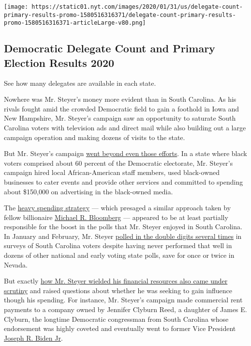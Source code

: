 \href{https://www.nytimes.com/interactive/2020/us/elections/delegate-count-primary-results.html}{}

\texttt{[image: https://static01.nyt.com/images/2020/01/31/us/delegate-count-primary-results-promo-1580516316371/delegate-count-primary-results-promo-1580516316371-articleLarge-v80.png]}

\hypertarget{democratic-delegate-count-and-primary-election-results-2020}{%
\subsection{Democratic Delegate Count and Primary Election Results
2020}\label{democratic-delegate-count-and-primary-election-results-2020}}

See how many delegates are available in each state.

Nowhere was Mr. Steyer's money more evident than in South Carolina. As
his rivals fought amid the crowded Democratic field to gain a foothold
in Iowa and New Hampshire, Mr. Steyer's campaign saw an opportunity to
saturate South Carolina voters with television ads and direct mail while
also building out a large campaign operation and making dozens of visits
to the state.

But Mr. Steyer's campaign
\href{https://www.nytimes.com/2020/01/25/us/politics/tom-steyer-millions-south-carolina.html}{went
beyond even those efforts}. In a state where black voters comprised
about 60 percent of the Democratic electorate, Mr. Steyer's campaign
hired local African-American staff members, used black-owned businesses
to cater events and provide other services and committed to spending
about \$150,000 on advertising in the black-owned media.

The
\href{https://www.nytimes.com/2019/07/19/us/politics/tom-steyer-2020-campaign.html}{heavy
spending strategy} --- which presaged a similar approach taken by fellow
billionaire
\href{https://www.nytimes.com/interactive/2020/us/elections/michael-bloomberg.html}{Michael
R. Bloomberg} --- appeared to be at least partially responsible for the
boost in the polls that Mr. Steyer enjoyed in South Carolina. In January
and February, Mr. Steyer
\href{https://www.nytimes.com/2020/01/09/upshot/tom-steyer-poll.html}{polled
in the double digits several times} in surveys of South Carolina voters
despite having never performed that well in dozens of other national and
early voting state polls, save for once or twice in Nevada.

But exactly
\href{https://www.nytimes.com/2020/02/24/us/politics/tom-steyer-james-clyburn-south-carolina.html}{how
Mr. Steyer wielded his financial resources also came under scrutiny} and
raised questions about whether he was seeking to gain influence though
his spending. For instance, Mr. Steyer's campaign made commercial rent
payments to a company owned by Jennifer Clyburn Reed, a daughter of
James E. Clyburn, the longtime Democratic congressman from South
Carolina whose endorsement was highly coveted and eventually went to
former Vice President
\href{https://www.nytimes.com/interactive/2020/us/elections/joe-biden.html}{Joseph
R. Biden Jr}.

